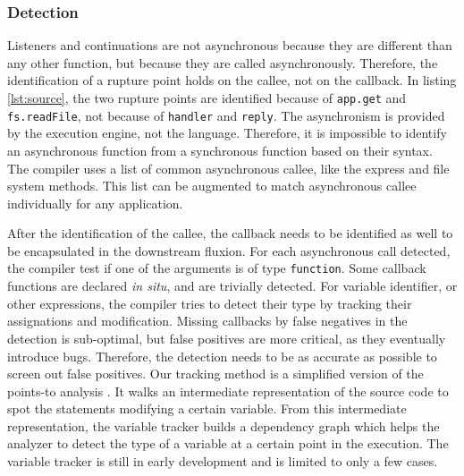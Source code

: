 

\subsubsection{Detection}

Listeners and continuations are not asynchronous because they are different than any other function, but because they are called asynchronously.
Therefore, the identification of a rupture point holds on the callee, not on the callback.
In listing \ref{lst:source}, the two rupture points are identified because of \texttt{app.get} and \texttt{fs.readFile}, not because of \texttt{handler} and \texttt{reply}.
The asynchronism is provided by the execution engine, not the language.
Therefore, it is impossible to identify an asynchronous function from a synchronous function based on their syntax.
The compiler uses a list of common asynchronous callee, like the express and file system methods.
This list can be augmented to match asynchronous callee individually for any application.


After the identification of the callee, the callback needs to be identified as well to be encapsulated in the downstream fluxion.
For each asynchronous call detected, the compiler test if one of the arguments is of type \texttt{function}.
Some callback functions are declared \textit{in situ}, and are trivially detected.
For variable identifier, or other expressions, the compiler tries to detect their type by tracking their assignations and modification.
Missing callbacks by false negatives in the detection is sub-optimal, but false positives are more critical, as they eventually introduce bugs.
Therefore, the detection needs to be as accurate as possible to screen out false positives.
Our tracking method is a simplified version of the points-to analysis \cite{Wei2014}.
It walks an intermediate representation of the source code to spot the statements modifying a certain variable.
From this intermediate representation, the variable tracker builds a dependency graph which helps the analyzer to detect the type of a variable at a certain point in the execution.
The variable tracker is still in early development and is limited to only a few cases.

